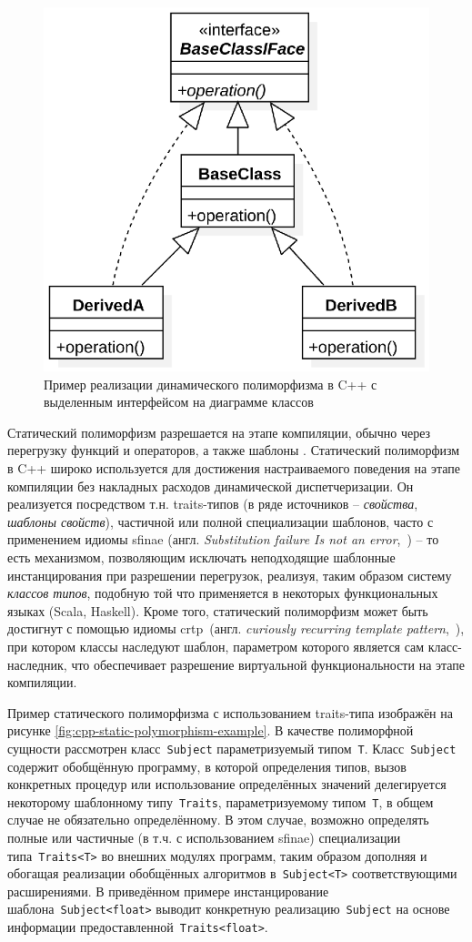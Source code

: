 \begin{figure}
    \centering
    \includegraphics[width=0.5\linewidth]{images/illustrative/runtime polymorphism w iface.eps}
    \caption{Пример реализации динамического полиморфизма в C++ с выделенным интерфейсом на диаграмме классов}
    \label{fig:cpp-runtime-polymorphism-example-w-iface}
\end{figure}

Статический полиморфизм
разрешается на этапе компиляции, обычно через перегрузку функций
и операторов, а также шаблоны \cite{Stroustrup2013}.
Статический полиморфизм в C++ широко используется для достижения
настраиваемого поведения на этапе компиляции без накладных
расходов динамической диспетчеризации. Он реализуется
посредством т.н. traits-типов (в ряде источников -- \emph{свойства},
\emph{шаблоны свойств}), частичной или полной специализации
шаблонов, часто с применением идиомы
\acrshort{sfinae} (англ. \emph{Substitution failure Is not an error},~\cite{Vandevoorde2002-cpp-templates}) -- то есть
механизмом, позволяющим исключать неподходящие
шаблонные инстанцирования при разрешении перегрузок, реализуя,
таким образом систему \emph{классов типов}, подобную той что применяется в
некоторых функциональных языках (Scala, Haskell). Кроме
того, статический полиморфизм может быть достигнут с
помощью идиомы \acrshort{crtp}~(англ. \emph{curiously recurring template pattern},~\cite{Abrahams2005-cpp-metaprogramming}),
при котором классы наследуют шаблон, параметром которого является
сам класс-наследник, что обеспечивает разрешение виртуальной
функциональности на этапе компиляции.

Пример статического полиморфизма с использованием traits-типа
изображён на рисунке \ref{fig:cpp-static-polymorphism-example}.
В качестве полиморфной сущности рассмотрен
класс~\texttt{Subject} параметризуемый типом~\texttt{T}.
Класс~\texttt{Subject} содержит обобщённую программу, в которой
определения типов, вызов конкретных процедур или использование
определённых значений делегируется некоторому шаблонному
типу~\texttt{Traits}, параметризуемому типом~\texttt{T}, в общем
случае не обязательно определённому.
В этом случае, возможно определять полные или частичные (в т.ч.
с использованием \acrshort{sfinae}) специализации типа~\texttt{Traits<T>}
во внешних модулях программ, таким образом дополняя и обогащая
реализации обобщённых алгоритмов в~\texttt{Subject<T>}
соответствующими расширениями. В приведённом примере
инстанцирование шаблона~\texttt{Subject<float>} выводит
конкретную реализацию~\texttt{Subject} на основе информации
предоставленной~\texttt{Traits<float>}.


